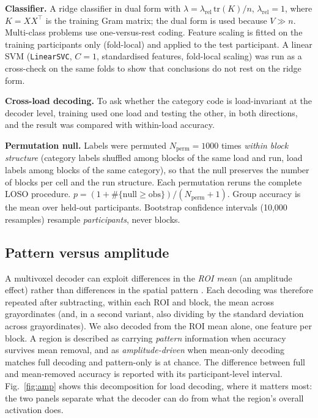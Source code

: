 \documentclass[conference]{IEEEtran}
\begin{document}
\textbf{Classifier.} A ridge classifier in dual form with $\lambda=\lambda_{\mathrm{rel}}\,\mathrm{tr}(K)/n$, $\lambda_{\mathrm{rel}}=1$, where $K=XX^{\top}$ is the training Gram matrix; the dual form is used because $V\gg n$. Multi-class problems use one-versus-rest coding. Feature scaling is fitted on the training participants only (fold-local) and applied to the test participant. A linear SVM (\texttt{LinearSVC}, $C=1$, standardised features, fold-local scaling) was run as a cross-check on the same folds to show that conclusions do not rest on the ridge form.

\textbf{Cross-load decoding.} To ask whether the category code is load-invariant at the decoder level, training used one load and testing the other, in both directions, and the result was compared with within-load accuracy.

\textbf{Permutation null.} Labels were permuted $N_{\mathrm{perm}}=1000$ times \emph{within block structure} (category labels shuffled among blocks of the same load and run, load labels among blocks of the same category), so that the null preserves the number of blocks per cell and the run structure. Each permutation reruns the complete LOSO procedure. $p=(1+\#\{\text{null}\ge\text{obs}\})/(N_{\mathrm{perm}}+1)$. Group accuracy is the mean over held-out participants. Bootstrap confidence intervals (10{,}000 resamples) resample \emph{participants}, never blocks.

\subsection{Pattern versus amplitude}
\label{sec:amp}
A multivoxel decoder can exploit differences in the \emph{ROI mean} (an amplitude effect) rather than differences in the spatial pattern \cite{coutanche2013}. Each decoding was therefore repeated after subtracting, within each ROI and block, the mean across grayordinates (and, in a second variant, also dividing by the standard deviation across grayordinates). We also decoded from the ROI mean alone, one feature per block. A region is described as carrying \emph{pattern} information when accuracy survives mean removal, and as \emph{amplitude-driven} when mean-only decoding matches full decoding and pattern-only is at chance. The difference between full and mean-removed accuracy is reported with its participant-level interval. Fig.~\ref{fig:amp} shows this decomposition for load decoding, where it matters most: the two panels separate what the decoder can do from what the region's overall activation does.
\end{document}
